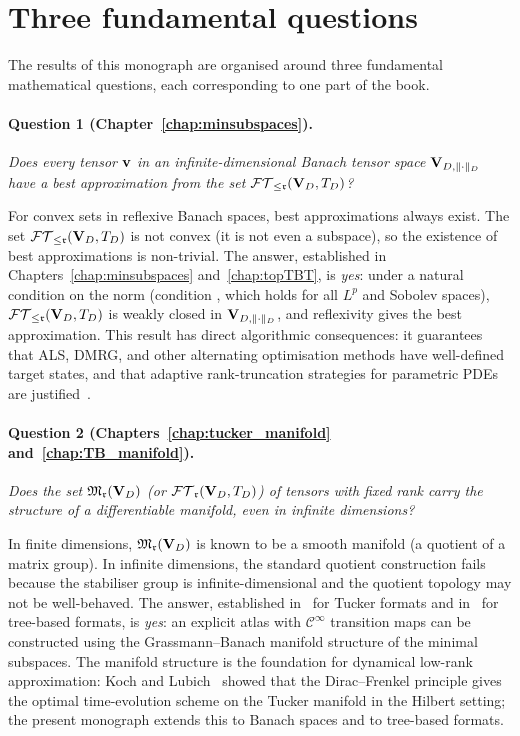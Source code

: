 \section{Three fundamental questions}
\label{sec:intro:questions}

The results of this monograph are organised around three fundamental
mathematical questions, each corresponding to one part of the book.

\paragraph{Question 1 (Chapter~\ref{chap:minsubspaces}).}
\emph{Does every tensor $\mathbf{v}$ in an infinite-dimensional Banach tensor
space $\mathbf{V}_{D,\|\cdot\|_D}$ have a best approximation from the set
$\mathcal{FT}_{\leq \mathfrak{r}}(\mathbf{V}_D,T_D)$?}

For convex sets in reflexive Banach spaces, best approximations always
exist. The set $\mathcal{FT}_{\leq \mathfrak{r}}(\mathbf{V}_D,T_D)$ is not convex (it is not even a
subspace), so the existence of best approximations is non-trivial.
The answer, established in Chapters~\ref{chap:minsubspaces}
and~\ref{chap:topTBT}, is \emph{yes}: under a natural condition on the
norm (condition \condINJ, which holds for all $L^p$ and Sobolev spaces),
$\mathcal{FT}_{\leq \mathfrak{r}}(\mathbf{V}_D,T_D)$ is weakly closed in $\mathbf{V}_{D,\|\cdot\|_D}$, and reflexivity
gives the best approximation. This result has direct algorithmic
consequences: it guarantees that ALS, DMRG, and other alternating
optimisation methods have well-defined target states, and that
adaptive rank-truncation strategies for parametric PDEs are
justified~\cite{Bachmayr2016,Nouy2017}.

\paragraph{Question 2 (Chapters~\ref{chap:tucker_manifold}
and~\ref{chap:TB_manifold}).}
\emph{Does the set $\mathfrak{M}_{\mathfrak{r}}(\mathbf{V}_D)$ (or $\mathcal{FT}_{\mathfrak{r}}(\mathbf{V}_D,T_D)$) of tensors with
fixed rank carry the structure of a differentiable manifold, even in
infinite dimensions?}

In finite dimensions, $\mathfrak{M}_{\mathfrak{r}}(\mathbf{V}_D)$ is known to be a smooth
manifold (a quotient of a matrix group). In infinite dimensions, the
standard quotient construction fails because the stabiliser group is
infinite-dimensional and the quotient topology may not be well-behaved.
The answer, established in~\cite{FHN2019} for Tucker formats and
in~\cite{FHN2023} for tree-based formats, is \emph{yes}: an explicit
atlas with $\mathcal{C}^\infty$ transition maps can be constructed
using the Grassmann--Banach manifold structure of the minimal subspaces.
The manifold structure is the foundation for dynamical low-rank
approximation: Koch and Lubich~\cite{KochLubich2007} showed that the
Dirac--Frenkel principle gives the optimal time-evolution scheme on the
Tucker manifold in the Hilbert setting; the present monograph extends
this to Banach spaces and to tree-based formats.

